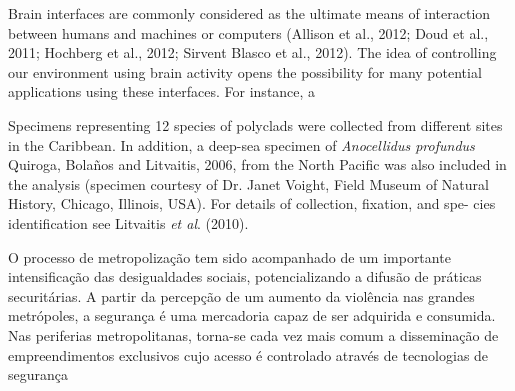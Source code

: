 \begin{multicols}{2}
\par{}Brain interfaces are commonly considered as the
ultimate means of interaction between humans and
machines or computers (Allison et al., 2012; Doud et al.,
2011; Hochberg et al., 2012; Sirvent Blasco et al.,
2012). The idea of controlling our environment using
brain activity opens the possibility for many potential
applications using these interfaces. For instance, a


\lipsum



\par{}Specimens representing 12 species of polyclads were
collected from different sites in the Caribbean. In addition,
a deep-sea specimen of \textit{Anocellidus profundus} Quiroga,
Bolaños and Litvaitis, 2006, from the North Pacific was
also included in the analysis (specimen courtesy of Dr.
Janet Voight, Field Museum of Natural History, Chicago,
Illinois, USA). For details of collection, fixation, and spe-
cies identification see Litvaitis \textit{et al}. (2010).

\lipsum
{}

\par{}O processo de metropolização tem sido acompanhado
de um importante intensificação das desigualdades sociais, potencializando a difusão de práticas securitárias.
A partir da percepção de um aumento da violência nas
grandes metrópoles, a segurança é uma mercadoria
capaz de ser adquirida e consumida. Nas periferias
metropolitanas, torna-se cada vez mais comum a
disseminação de empreendimentos exclusivos cujo
acesso é controlado através de tecnologias de segurança


\lipsum



\lipsum



\end{multicols}
